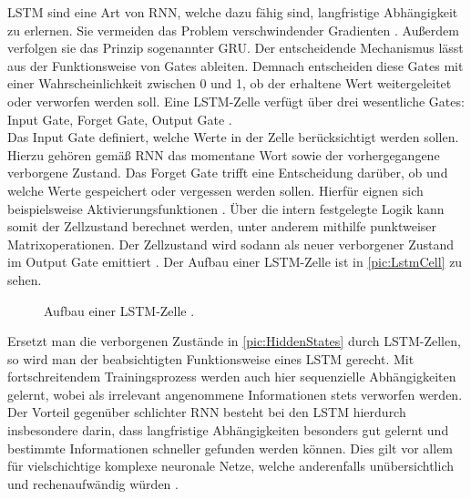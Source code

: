 \noindent
\ac{LSTM} sind eine Art von \ac{RNN}, welche dazu fähig sind, langfristige Abhängigkeit zu erlernen. Sie vermeiden das Problem verschwindender Gradienten \cite{AIU19}. Außerdem verfolgen sie das Prinzip sogenannter \ac{GRU}. Der entscheidende Mechanismus lässt aus der Funktionsweise von Gates ableiten. Demnach entscheiden diese Gates mit einer Wahrscheinlichkeit zwischen 0 und 1, ob der erhaltene Wert weitergeleitet oder verworfen werden soll. Eine \ac{LSTM}-Zelle verfügt über drei wesentliche Gates: Input Gate, Forget Gate, Output Gate \cite[S.~347-348]{ZHA20}.\\

\noindent
Das Input Gate definiert, welche Werte in der Zelle berücksichtigt werden sollen. Hierzu gehören gemäß \ac{RNN} das momentane Wort sowie der vorhergegangene verborgene Zustand. Das Forget Gate trifft eine Entscheidung darüber, ob und welche Werte gespeichert oder vergessen werden sollen. Hierfür eignen sich beispielsweise Aktivierungsfunktionen \cite[S.~355]{ZHA20}. Über die intern festgelegte Logik kann somit der Zellzustand berechnet werden, unter anderem mithilfe punktweiser Matrixoperationen. Der Zellzustand wird sodann als neuer verborgener Zustand im Output Gate emittiert \cite{LUB18}. Der Aufbau einer \ac{LSTM}-Zelle ist in \autoref{pic:LstmCell} zu sehen.

\begin{figure}[h!]
  \centering
  \caption{Aufbau einer LSTM-Zelle \cite[S.~357]{ZHA20}.}
  \label{pic:LstmCell}
\end{figure}

\noindent
Ersetzt man die verborgenen Zustände in \autoref{pic:HiddenStates} durch \ac{LSTM}-Zellen, so wird man der beabsichtigten Funktionsweise eines \ac{LSTM} gerecht. Mit fortschreitendem Trainingsprozess werden auch hier sequenzielle Abhängigkeiten gelernt, wobei als irrelevant angenommene Informationen stets verworfen werden. Der Vorteil gegenüber schlichter \ac{RNN} besteht bei den \ac{LSTM} hierdurch insbesondere darin, dass langfristige Abhängigkeiten besonders gut gelernt und bestimmte Informationen schneller gefunden werden können. Dies gilt vor allem für vielschichtige komplexe neuronale Netze, welche anderenfalls unübersichtlich und rechenaufwändig würden \cite{LUB18}.\\

